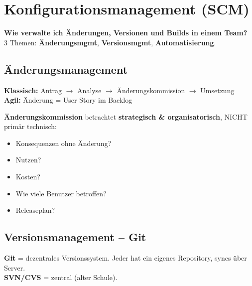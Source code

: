 \documentclass[11pt,a4paper]{article}
\begin{document}
\newpage
\section{Konfigurationsmanagement (SCM)}

\begin{tldr}
\textbf{Wie verwalte ich Änderungen, Versionen und Builds in einem Team?}\\
3 Themen: \textbf{Änderungsmgmt}, \textbf{Versionsmgmt}, \textbf{Automatisierung}.
\end{tldr}

\subsection{Änderungsmanagement}

\begin{keyfacts}
\textbf{Klassisch:} Antrag $\rightarrow$ Analyse $\rightarrow$ Änderungskommission $\rightarrow$ Umsetzung\\
\textbf{Agil:} Änderung = User Story im Backlog
\end{keyfacts}

\begin{merkhilfe}
\textbf{Änderungskommission} betrachtet \textbf{strategisch \& organisatorisch}, NICHT primär technisch:
\begin{itemize}
  \item Konsequenzen ohne Änderung?
  \item Nutzen?
  \item Kosten?
  \item Wie viele Benutzer betroffen?
  \item Releaseplan?
\end{itemize}
\end{merkhilfe}

\subsection{Versionsmanagement -- Git}

\begin{story}
\textbf{Git} = dezentrales Versionssystem. Jeder hat ein eigenes Repository, syncs über Server.\\
\textbf{SVN/CVS} = zentral (alter Schule).
\end{story}
\end{document}
